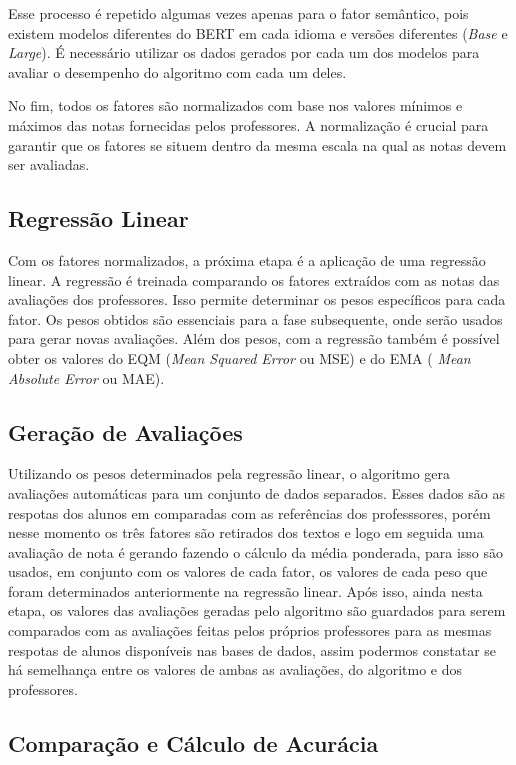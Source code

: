 Esse processo é repetido algumas vezes apenas para o fator semântico, pois existem modelos diferentes do BERT em cada idioma e versões diferentes (\textit{Base} e \textit{Large}). É necessário utilizar os dados gerados por cada um dos modelos para avaliar o desempenho do algoritmo com cada um deles.

No fim, todos os fatores são normalizados com base nos valores mínimos e máximos das notas fornecidas pelos professores. A normalização é crucial para garantir que os fatores se situem dentro da mesma escala na qual as notas devem ser avaliadas.

\subsection{Regressão Linear}

Com os fatores normalizados, a próxima etapa é a aplicação de uma regressão linear. A regressão é treinada comparando os fatores extraídos com as notas das avaliações dos professores. Isso permite determinar os pesos específicos para cada fator. Os pesos obtidos são essenciais para a fase subsequente, onde serão usados para gerar novas avaliações. Além dos pesos, com a regressão também é possível obter os valores do EQM (\textit{Mean Squared Error} ou MSE) e do EMA (\textit{ Mean Absolute Error} ou MAE).

\subsection{Geração de Avaliações}

Utilizando os pesos determinados pela regressão linear, o algoritmo gera avaliações automáticas para um conjunto de dados separados. Esses dados são as respotas dos alunos em comparadas com as referências dos professsores, porém nesse momento os três fatores são retirados dos textos e logo em seguida uma avaliação de nota é gerando fazendo o cálculo da média ponderada, para isso são usados, em conjunto com os valores de cada fator, os valores de cada peso que foram determinados anteriormente na regressão linear. Após isso, ainda nesta etapa, os valores das avaliações geradas pelo algoritmo são guardados para serem comparados com as avaliações feitas pelos próprios professores para as mesmas respotas de alunos disponíveis nas bases de dados, assim podermos constatar se há semelhança entre os valores de ambas as avaliações, do algoritmo e dos professores.

\subsection{Comparação e Cálculo de Acurácia}

